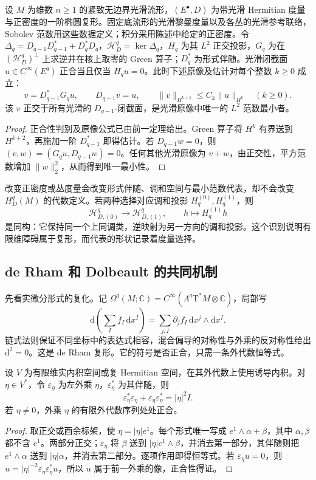 \begin{corollary}\label{g3:cor:canonical-complex-primitive}
	设 \(M\) 为维数 \(n\ge1\) 的紧致无边界光滑流形，\((E^\bullet,D)\) 为带光滑 Hermitian 度量与正密度的一阶椭圆复形。固定底流形的光滑黎曼度量以及各丛的光滑参考联络，Sobolev 范数用这些数据定义；积分采用陈述中给定的正密度。令 \(\Delta_q=D_{q-1}D_{q-1}^*+D_q^*D_q\)，\(\mathcal H_D^q=\ker\Delta_q\)，\(H_q\) 为其 \(L^2\) 正交投影，\(G_q\) 为在 \((\mathcal H_D^q)^\perp\) 上求逆并在核上取零的 Green 算子；\(D_q^*\) 为形式伴随。光滑闭截面 \(u\in C^\infty(E^q)\) 正合当且仅当 \(H_qu=0\)。此时下述原像及估计对每个整数 \(k\ge0\) 成立：
	\[
		v=D_{q-1}^*G_qu,\qquad D_{q-1}v=u,
		\qquad \|v\|_{H^{k+1}}\le C_k\|u\|_{H^k}\quad(k\ge0).
	\]
	该 \(v\) 正交于所有光滑的 \(D_{q-1}\)-闭截面，是光滑原像中唯一的 \(L^2\) 范数最小者。
\end{corollary}
\begin{proof}
	正合性判别及原像公式已由前一定理给出。Green 算子将 \(H^k\) 有界送到 \(H^{k+2}\)，再施加一阶 \(D_{q-1}^*\) 即得估计。若 \(D_{q-1}w=0\)，则
	\((v,w)=(G_qu,D_{q-1}w)=0\)。任何其他光滑原像为 \(v+w\)，由正交性，平方范数增加 \(\|w\|_2^2\)，从而得到唯一最小性。
\end{proof}

改变正密度或丛度量会改变形式伴随、调和空间与最小范数代表，却不会改变 \(H_D^q(M)\) 的代数定义。若两种选择对应调和投影 \(H_q^{(0)},H_q^{(1)}\)，则
\[
	\mathcal H_{D,(0)}^q\longrightarrow\mathcal H_{D,(1)}^q,
	\qquad h\longmapsto H_q^{(1)}h
\]
是同构：它保持同一个上同调类，逆映射为另一方向的调和投影。这个识别说明有限维障碍属于复形，而代表的形状记录着度量选择。

\subsection{de Rham 和 Dolbeault 的共同机制}
\label{g3:subsec:1304:05}
先看实微分形式的复化。记 \(\Omega^q(M;\mathbb C)=C^\infty(\Lambda^q\mathrm T^*M\otimes\mathbb C)\)，局部写
\[
	\mathrm d\left(\sum_I f_I\,\mathrm dx^I\right)
	=\sum_{j,I}\partial_jf_I\,\mathrm dx^j\wedge\mathrm dx^I.
\]
链式法则保证不同坐标中的表达式相容，混合偏导的对称性与外乘的反对称性给出 \(\mathrm d^2=0\)。这是 de Rham 复形。它的符号是否正合，只需一条外代数恒等式。

\begin{lemma}\label{g3:lem:wedge-contraction-symbol}
	设 \(V\) 为有限维实内积空间或复 Hermitian 空间，在其外代数上使用诱导内积。对 \(\eta\in V^*\)，令 \(\varepsilon_\eta\) 为左外乘 \(\eta\)，\(\varepsilon_\eta^*\) 为其伴随，则
	\[
		\varepsilon_\eta^*\varepsilon_\eta+
		\varepsilon_\eta\varepsilon_\eta^*=|\eta|^2I.
	\]
	若 \(\eta\ne0\)，外乘 \(\eta\) 的有限外代数序列处处正合。
\end{lemma}
\begin{proof}
	取正交或酉余标架，使 \(\eta=|\eta|e^1\)。每个形式唯一写成 \(e^1\wedge\alpha+\beta\)，其中 \(\alpha,\beta\) 都不含 \(e^1\)。两部分正交；\(\varepsilon_\eta\) 将 \(\beta\) 送到 \(|\eta|e^1\wedge\beta\)，并消去第一部分，其伴随则把 \(e^1\wedge\alpha\) 送到 \(|\eta|\alpha\)，并消去第二部分。逐项作用即得恒等式。若 \(\varepsilon_\eta u=0\)，则
	\(u=|\eta|^{-2}\varepsilon_\eta\varepsilon_\eta^*u\)，所以 \(u\) 属于前一外乘的像，正合性得证。
\end{proof}

